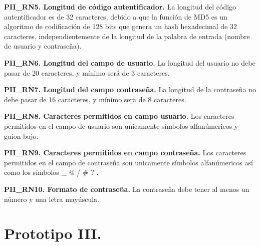 \documentclass[12pt, a4paper, titlepage]{report}
\begin{document}
			\textbf{PII\_RN5. Longitud de código autentificador.} La longitud del código autentificador es de 32 caracteres, debido a que la función de MD5 es un algoritmo de codificación de 128 bits que genera un hash hexadecimal de 32 caracteres, independientemente de la longitud de la palabra de entrada (nombre de usuario y contraseña).\\
			\label{PII_RN5}
			
			\textbf{PII\_RN6. Longitud del campo de usuario.} La longitud del usuario no debe pasar de 20 caracteres, y mínimo será de 3 caracteres.\\
			\label{PII_RN6}
			
			\textbf{PII\_RN7. Longitud del campo contraseña.}
			La longitud de la contraseña no debe pasar de 16 caracteres, y mínimo sera de 8 caracteres.\\
			\label{PII_RN7}
			
			\textbf{PII\_RN8. Caracteres permitidos en campo usuario.} Los caracteres permitidos en el campo de usuario son unicamente símbolos alfanúmericos y guion bajo.\\
			\label{PII_RN8}
			
			\textbf{PII\_RN9. Caracteres permitidos en campo contraseña.} Los caracteres permitidos en el campo de contraseña son unicamente símbolos alfanúmericos así como los s\'imbolos \_ @ / \# ? .\\
			\label{PII_RN9}
			
			\textbf{PII\_RN10. Formato de contraseña.} La contraseña debe tener al menos un número y una letra mayúscula.\\
			\label{PII_RN10}
				
	
	    \section{Prototipo III.}
\end{document}
